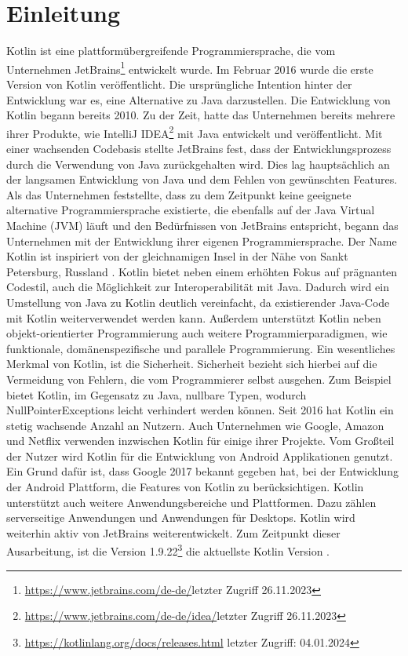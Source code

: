\documentclass{article}
\begin{document}
\section{Einleitung}
Kotlin ist eine plattformübergreifende Programmiersprache, die vom Unternehmen JetBrains\footnote{\url{https://www.jetbrains.com/de-de/}letzter Zugriff 26.11.2023} entwickelt wurde. Im Februar 2016 wurde die erste Version von Kotlin veröffentlicht. Die ursprüngliche Intention hinter der Entwicklung war es, eine Alternative zu Java darzustellen. Die Entwicklung von Kotlin begann bereits 2010. Zu der Zeit, hatte das Unternehmen bereits mehrere ihrer Produkte, wie IntelliJ IDEA\footnote{\url{https://www.jetbrains.com/de-de/idea/}letzter Zugriff 26.11.2023} mit Java entwickelt und veröffentlicht. Mit einer wachsenden Codebasis stellte JetBrains fest, dass der Entwicklungsprozess durch die Verwendung von Java zurückgehalten wird. Dies lag hauptsächlich an der langsamen Entwicklung von Java und dem Fehlen von gewünschten Features. Als das Unternehmen feststellte, dass zu dem Zeitpunkt keine geeignete alternative Programmiersprache existierte, die ebenfalls auf der Java Virtual Machine (JVM) läuft und den Bedürfnissen von JetBrains entspricht, begann das Unternehmen mit der Entwicklung ihrer eigenen Programmiersprache. Der Name Kotlin ist inspiriert von der gleichnamigen Insel in der Nähe von Sankt Petersburg, Russland \cite{Kotlin_In-D}. \newline
Kotlin bietet neben einem erhöhten Fokus auf prägnanten Codestil, auch die Möglichkeit zur Interoperabilität mit Java. Dadurch wird ein Umstellung von Java zu Kotlin deutlich vereinfacht, da existierender Java-Code mit Kotlin weiterverwendet werden kann. Außerdem unterstützt Kotlin neben objekt-orientierter Programmierung auch weitere Programmierparadigmen, wie funktionale, domänenspezifische und parallele Programmierung. Ein wesentliches Merkmal von Kotlin, ist die Sicherheit. Sicherheit bezieht sich hierbei auf die Vermeidung von Fehlern, die vom Programmierer selbst ausgehen. Zum Beispiel bietet Kotlin, im Gegensatz zu Java, nullbare Typen, wodurch NullPointerExceptions leicht verhindert werden können. Seit 2016 hat Kotlin ein stetig wachsende Anzahl an Nutzern. Auch Unternehmen wie Google, Amazon und Netflix verwenden inzwischen Kotlin für einige ihrer Projekte. Vom Großteil der Nutzer wird Kotlin für die Entwicklung von Android Applikationen genutzt. Ein Grund dafür ist, dass Google 2017 bekannt gegeben hat, bei der Entwicklung der Android Plattform, die Features von Kotlin zu berücksichtigen. Kotlin unterstützt auch weitere Anwendungsbereiche und Plattformen. Dazu zählen serverseitige Anwendungen und Anwendungen für Desktops. Kotlin wird weiterhin aktiv von JetBrains weiterentwickelt. Zum Zeitpunkt dieser Ausarbeitung, ist die Version 1.9.22\footnote{\url{https://kotlinlang.org/docs/releases.html} letzter Zugriff: 04.01.2024} die aktuellste Kotlin Version \cite{Kotlin_In-D}.
\end{document}
